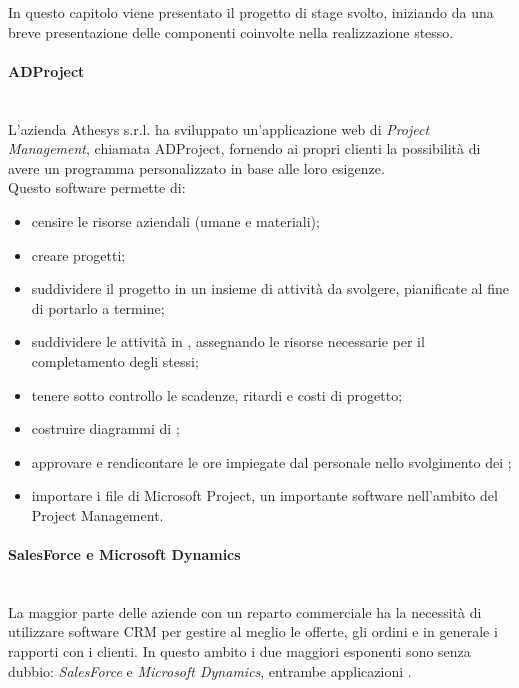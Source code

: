 \documentclass[12pt,a4paper,twoside,openany,english]{book}
\begin{document}
	In questo capitolo viene presentato il progetto di stage svolto, iniziando da una breve presentazione delle componenti coinvolte nella realizzazione stesso.
	
	\paragraph{ADProject}~\\
		L’azienda Athesys s.r.l. ha sviluppato un'applicazione web di \textit{Project Management}, chiamata ADProject, fornendo ai propri clienti la possibilità di avere un programma personalizzato in base alle loro esigenze.\\
		Questo software permette di:
		\begin{itemize}
			\itemsep-0.5em 
			\item censire le risorse aziendali (umane e materiali);
			\item creare progetti;
			\item suddividere il progetto in un insieme di attività da svolgere, pianificate al fine di portarlo a termine;
			\item suddividere le attività in , assegnando le risorse necessarie per il completamento degli stessi;
			\item tenere sotto controllo le scadenze, ritardi e costi di progetto;
			\item costruire diagrammi di ;
			\item approvare e rendicontare le ore impiegate dal personale nello svolgimento dei ;
			\item importare i file di Microsoft Project, un importante software nell'ambito del Project Management.
		\end{itemize} 
	\par
	
	\paragraph{SalesForce e Microsoft Dynamics}~\\
		La maggior parte delle aziende con un reparto commerciale ha la necessità di utilizzare software \gls{CRM} per gestire al meglio le offerte, gli ordini e in generale i rapporti con i clienti. In questo ambito i due maggiori esponenti sono senza dubbio: \textit{SalesForce} e \textit{Microsoft Dynamics}, entrambe applicazioni \textit{}.
	\par
\end{document}
